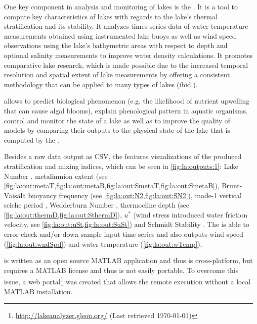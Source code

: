 One key component in analysis and monitoring of lakes is the \la \citep{read2011derivation}. It is a tool to compute key characteristics of lakes with regards to the lake's thermal stratification and its stability. It analyzes times series data of water temperature measurements obtained using instrumented lake buoys as well as wind speed observations using the lake's bathymetric areas with respect to depth and optional salinity measurements to improve water density calculations. It promotes comparative lake research, which is made possible due to the increased temporal resolution and spatial extent of lake measurements by offering a consistent methodology that can be applied to many types of lakes (ibid.).

\la allows to predict biological phenomenon (e.g. the likelihood of nutrient upwelling that can cause algal blooms), explain phenological pattern in aquatic organisms, control and monitor the state of a lake as well as to improve the quality of models by comparing their outputs to the physical state of the lake that is computed by the \la.



Besides a raw data output as \ac{CSV}, the \la features visualizations of the produced stratification and mixing indices, which can be seen in \cref{fig:la:outputs:1}: Lake Number \citep[see \cref{fig:la:out:Ln,fig:la:out:SLn},][]{imberger1990}, metalimnion extent (see \cref{fig:la:out:metaT,fig:la:out:metaB,fig:la:out:SmetaT,fig:la:out:SmetaB}), Brunt-Väisälä buoyancy frequency (see \cref{fig:la:out:N2,fig:la:out:SN2}), mode-1 vertical seiche period \citep[see \cref{fig:la:out:T1,fig:la:out:ST1},][]{monismith1986}, Wedderburn Number \citep[see \cref{fig:la:out:W,fig:la:out:SW},][]{thompson1980}, thermocline depth (see \cref{fig:la:out:thermD,fig:la:out:SthermD}), $u^{*}$ (wind stress introduced water friction velocity, see \cref{fig:la:out:uSt,fig:la:out:SuSt}) and Schmidt Stability \citep[see \cref{fig:la:out:St},][]{schmidt1928,hutchinson1957,idso1973}. The \la is able to error check and/or down sample input time series and also outputs wind speed (\cref{fig:la:out:wndSpd}) and water temperature (\cref{fig:la:out:wTemp}).

\la is written as an open source MATLAB application and thus is cross-platform, but requires a MATLAB license and thus is not easily portable. To overcome this issue, a web portal\footnote{\url{http://lakeanalyzer.gleon.org/} (Last retrieved \today)} was created that allows the remote \la execution without a local MATLAB installation.

